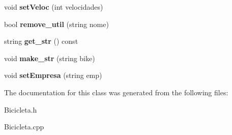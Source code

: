 \begin{DoxyCompactItemize}
\item 
\hypertarget{class_bicicleta_aef781f0496eab00a16c354d52f9f1686}{void {\bfseries set\+Veloc} (int velocidades)}\label{class_bicicleta_aef781f0496eab00a16c354d52f9f1686}

\item 
\hypertarget{class_bicicleta_a791cdbbf5016ea3a0229915b84a52a04}{bool {\bfseries remove\+\_\+util} (string nome)}\label{class_bicicleta_a791cdbbf5016ea3a0229915b84a52a04}

\item 
\hypertarget{class_bicicleta_a570101dbac9300d107433c52ae698915}{string {\bfseries get\+\_\+str} () const }\label{class_bicicleta_a570101dbac9300d107433c52ae698915}

\item 
\hypertarget{class_bicicleta_aff75cc7f6d1a554a8b7c663834115575}{void {\bfseries make\+\_\+str} (string bike)}\label{class_bicicleta_aff75cc7f6d1a554a8b7c663834115575}

\item 
\hypertarget{class_bicicleta_ae48de57881e09ac89a84558c79894640}{void {\bfseries set\+Empresa} (string emp)}\label{class_bicicleta_ae48de57881e09ac89a84558c79894640}

\end{DoxyCompactItemize}


The documentation for this class was generated from the following files\+:\begin{DoxyCompactItemize}
\item 
Bicicleta.\+h\item 
Bicicleta.\+cpp\end{DoxyCompactItemize}
